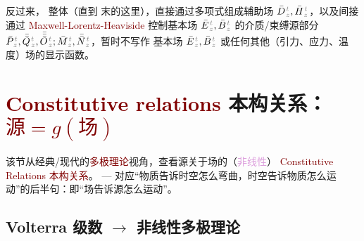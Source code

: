 反过来， 整体（直到  末的这里），直接通过多项式组成\textcolor{NavyBlue}{辅助场} $\bar{D}^{\;\!\mathcolor{gray}{t}}_{\;\!\mathcolor{gray}{z}}, \bar{H}^{\;\!\mathcolor{gray}{t}}_{\;\!\mathcolor{gray}{z}}$，以及间接通过 \textcolor{Maroon}{Maxwell-Lorentz-Heaviside}  控制\textcolor{NavyBlue}{基本场} $\bar{E}^{\;\!\mathcolor{gray}{t}}_{\;\!\mathcolor{gray}{z}}, \bar{B}^{\;\!\mathcolor{gray}{t}}_{\;\!\mathcolor{gray}{z}}$ 的介质/束缚源部分 $\bar{P}^{\;\!\mathcolor{gray}{t}}_{\;\!\mathcolor{gray}{z}},\bar{\bar{Q}}^{\;\!\mathcolor{gray}{t}}_{\;\!\mathcolor{gray}{z}},\bar{\bar{\bar{O}}}^{\;\!\mathcolor{gray}{t}}_{\;\!\mathcolor{gray}{z}} ; \bar{M}^{\;\!\mathcolor{gray}{t}}_{\;\!\mathcolor{gray}{z}}, \bar{\bar{N}}^{\;\!\mathcolor{gray}{t}}_{\;\!\mathcolor{gray}{z}}$，暂时不写作 \textcolor{NavyBlue}{基本场} $\bar{E}^{\;\!\mathcolor{gray}{t}}_{\;\!\mathcolor{gray}{z}}, \bar{B}^{\;\!\mathcolor{gray}{t}}_{\;\!\mathcolor{gray}{z}}$ 或任何其他（引力、应力、温度）场的显示函数。

\clearpage

\vspace*{-9.0em}

\section{\textcolor{Maroon}{Constitutive relations} 本构关系：\textcolor{Maroon}{$\text{源} = g(\text{场})$}}\label{sec:constitutive}

该节从经典/现代的\textcolor{Maroon}{多极理论}视角，查看源关于场的（\textcolor{Plum}{非线性}） \textcolor{Maroon}{Constitutive Relations} \textcolor{Maroon}{本构关系}。 --- 对应“物质告诉时空怎么弯曲，时空告诉物质怎么运动”的后半句：即“场告诉源怎么运动”。

\vspace*{-4.0em}

\subsection{Volterra 级数 $\longrightarrow$ 非线性多极理论}\label{ssec:PMQN-nonlinear}

